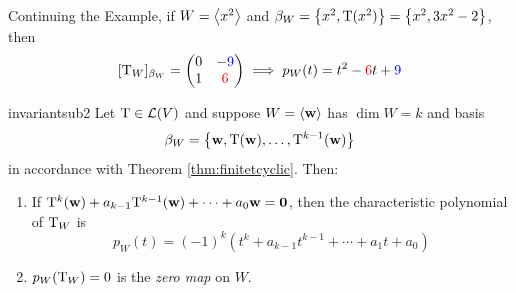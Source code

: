 \begin{tcolorbox}[exstyle]
	Continuing the Example, if $W=\left\langle x^2\right\rangle$ and $\beta_W =\big\{x^2,\mathrm{T}(x^2)\big\} =\big\{x^2,3x^2-2\big\}$, then
	\[
		[\mathrm{T}_W]_{\beta_W}=
		\begin{pmatrix}
			0&-\textcolor{blue}{9}\\
			1&\textcolor{red}{6}
		\end{pmatrix} 
		\implies p_W(t)=t^2-\textcolor{red}{6}t+\textcolor{blue}{9}
	\]
\end{tcolorbox}


\begin{lemm}{}{invariantsub2}
	Let $\mathrm{T}\in\mathcal{L}(V)$ and suppose $W=\left\langle {\mathbf{w}}\right\rangle$ has $\dim W=k$ and basis
	\[
		\beta_W=\big\{{\mathbf{w}},\mathrm{T}({\mathbf{w}}),\ldots,\mathrm{T}^{k-1}({\mathbf{w}})\big\}
	\]
	in accordance with Theorem \ref{thm:finitetcyclic}. Then:
	\begin{enumerate}
	  \item If $\mathrm{T}^k({\mathbf{w}})+a_{k-1}\mathrm{T}^{k-1}({\mathbf{w}})+\cdots+a_0{\mathbf{w}}=\mathbf{0}$, then the characteristic polynomial of $\mathrm{T}_W$ is
	  \[
	  	p_W(t)=(-1)^k\left(t^k+a_{k-1}t^{k-1}+\cdots+a_1t+a_0\right)
	  \]
	  \item $p_W(\mathrm{T}_W)=0$ is the \emph{zero map} on $W$.
	\end{enumerate}
\end{lemm}


